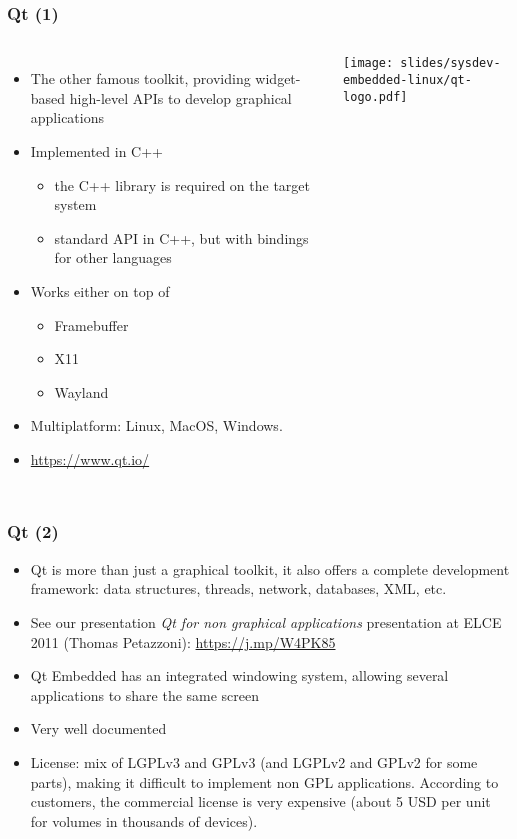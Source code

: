 \begin{frame}
  \frametitle{Qt (1)}
  \begin{columns}
  \begin{itemize}
  \item The other famous toolkit, providing widget-based high-level APIs to
    develop graphical applications
  \item Implemented in C++
    \begin{itemize}
    \item the C++ library is required on the target system
    \item standard API in C++, but with bindings for other languages
    \end{itemize}
  \item Works either on top of
    \begin{itemize}
    \item Framebuffer
    \item X11
    \item Wayland
    \end{itemize}
  \item Multiplatform: Linux, MacOS, Windows.
  \item \url{https://www.qt.io/}
  \end{itemize}
    \texttt{[image: slides/sysdev-embedded-linux/qt-logo.pdf]}\\
  \end{columns}
\end{frame}

\begin{frame}
  \frametitle{Qt (2)}
  \begin{itemize}
  \item Qt is more than just a graphical toolkit, it also offers a
    complete development framework: data structures, threads, network,
    databases, XML, etc.
  \item See our presentation {\em Qt for non graphical applications}
    presentation at ELCE 2011 (Thomas Petazzoni):
    \url{https://j.mp/W4PK85}
  \item Qt Embedded has an integrated windowing system, allowing
    several applications to share the same screen
  \item Very well documented
  \item License: mix of LGPLv3 and GPLv3 (and LGPLv2 and GPLv2 for some
        parts), making it difficult to implement non GPL applications.
        According to customers, the commercial license is very expensive
        (about 5 USD per unit for volumes in thousands of devices).
  \end{itemize}
\end{frame}

